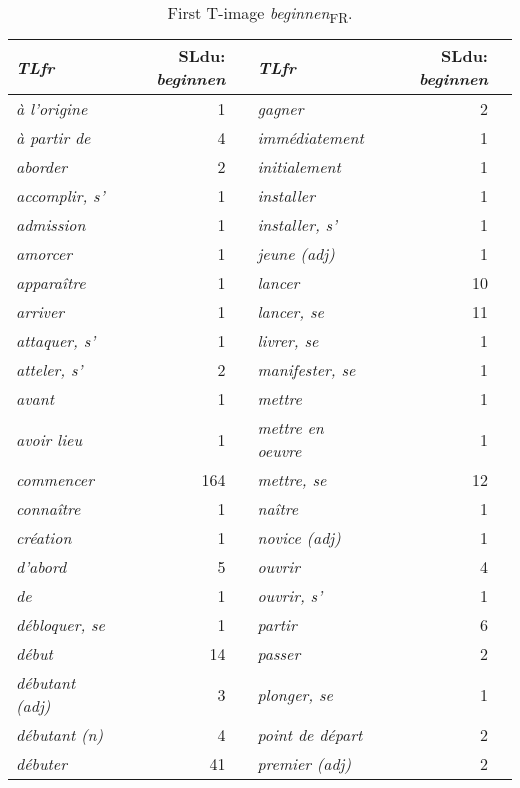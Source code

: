 \begin{table}\small
\caption{First T-image \textit{beginnen}\textsubscript{FR}.}
\begin{tabularx}{\textwidth}{>{\itshape}lrX>{\itshape}lrr}\lsptoprule
\normalfont TLfr & SLdu: \textit{beginnen}  &     & \normalfont TLfr  & SLdu: \textit{beginnen}\\\midrule
à l'origine &  1                     & & gagner &  2\\
à partir de &  4                          & & immédiatement &  1\\
aborder &  2                              & & initialement &  1\\
accomplir, s' &  1                        & & installer &  1\\
admission &  1                            & & installer, s' &  1\\
amorcer &  1                              & & jeune (adj) &  1\\
apparaître &  1                           & & lancer &  10\\
arriver &  1                              & & lancer, se &  11\\
attaquer, s' &  1                         & & livrer, se &  1\\
atteler, s' &  2                          & & manifester, se &  1\\
avant &  1                                & & mettre &  1\\
avoir lieu &  1                           & & mettre en oeuvre &  1\\
commencer &  164                          & & mettre, se &  12\\
connaître &  1                            & & naître &  1\\
création &  1                             & & novice (adj) &  1\\
d'abord &  5                              & & ouvrir &  4\\
de &  1                                   & & ouvrir, s' &  1\\
débloquer, se &  1                        & & partir &  6\\
début &  14                               & & passer &  2\\
débutant (adj) &  3                       & & plonger, se &  1\\
débutant (n) &  4                         & & point de départ &  2\\
débuter &  41                             & & premier (adj) &  2\\

\end{tabularx}
\end{table}
